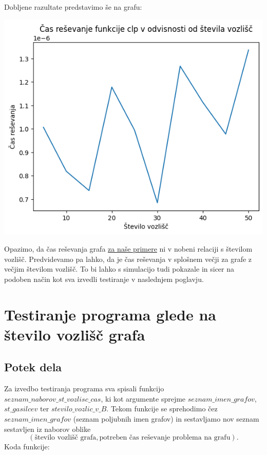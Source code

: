 \documentclass[a4paper, 12pt]{article}
\begin{document}
Dobljene razultate predstavimo še na grafu: \\
\begin{center}
    \includegraphics[scale=0.4]{cas}
\end{center}

\noindent Opazimo, da čas reševanja grafa \underline{za naše primere} ni v nobeni relaciji s
številom vozlišč.
Predvidevamo pa lahko, da je čas reševanja v splošnem večji za grafe z večjim 
številom vozlišč. To bi lahko s simulacijo tudi pokazale in sicer na podoben način
kot sva izvedli testiranje v naslednjem poglavju. 

\pagebreak

\overfullrule=0pt
\section{Testiranje programa glede na število vozlišč grafa}

\subsection{Potek dela}

Za izvedbo testiranja programa sva spisali funkcijo $seznam\_naborov\_st\_vozlisc\_cas$, ki
kot argumente sprejme $seznam\_imen\_grafov$, $st\_gasilcev$ ter $stevilo\_vozlic\_v\_B$. Tekom
funkcije se sprehodimo čez $seznam\_imen\_grafov$ (seznam poljubnih imen grafov) in sestavljamo 
nov seznam sestavljen iz naborov oblike  
$$\left( \text{število vozlišč grafa}, \text{potreben čas reševanje problema na grafu} \right).$$
Koda funkcije:
\end{document}
